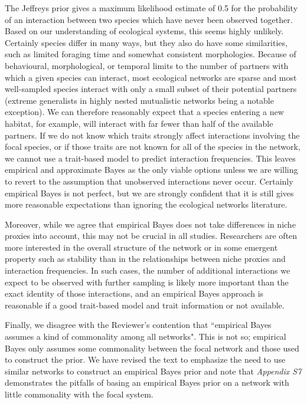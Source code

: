 \documentclass[12pt]{letter}
\begin{document}
		The Jeffreys prior gives a maximum likelihood estimate of 0.5 for the probability of an interaction between two species which have never been observed together. Based on our understanding of ecological systems, this seems highly unlikely. Certainly species differ in many ways, but they also do have some similarities, such as limited foraging time and somewhat consistent morphologies. Because of behavioural, morphological, or temporal limits to the number of partners with which a given species can interact, most ecological networks are sparse and most well-sampled species interact with only a small subset of their potential partners (extreme generalists in highly nested mutualistic networks being a notable exception). We can therefore reasonably expect that a species entering a new habitat, for example, will interact with far fewer than half of the available partners. If we do not know which traits strongly affect interactions involving the focal species, or if those traits are not known for all of the species in the network, we cannot use a trait-based model to predict interaction frequencies. This leaves empirical and approximate Bayes as the only viable options unless we are willing to revert to the assumption that unobserved interactions never occur. Certainly empirical Bayes is not perfect, but we are strongly confident that it is still gives more reasonable expectations than ignoring the ecological networks literature.


		Moreover, while we agree that empirical Bayes does not take differences in niche proxies into account, this may not be crucial in all studies. Researchers are often more interested in the overall structure of the network or in some emergent property such as stability than in the relationships between niche proxies and interaction frequencies. In such cases, the number of additional interactions we expect to be observed with further sampling is likely more important than the exact identity of those interactions, and an empirical Bayes approach is reasonable if a good trait-based model and trait information or not available. 


		Finally, we disagree with the Reviewer's contention that ``empirical Bayes assumes a kind of commonality among all networks". This is not so; empirical Bayes only assumes some commonality between the focal network and those used to construct the prior. We have revised the text to emphasize the need to use similar networks to construct an empirical Bayes prior and note that \emph{Appendix S7} demonstrates the pitfalls of basing an empirical Bayes prior on a network with little commonality with the focal system. 
\end{document}
